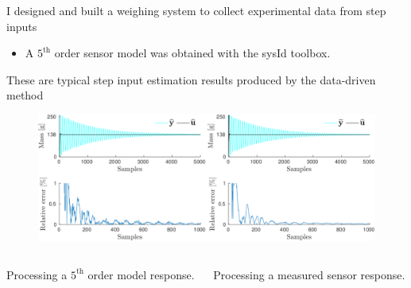 \documentclass[presentation]{beamer}
\begin{document}
\begin{frame}[label={slide:experimental-validation1}]{I designed and built a weighing system \linebreak to collect experimental data from step inputs}
\begin{figure}[!htb]
\end{figure}
\begin{itemize}
	\item A $5^{\text{th}}$ order sensor model was obtained \linebreak with the sysId toolbox.
\end{itemize}
\end{frame}

\begin{frame}[label={slide:experimental-validation2}]{These are typical step input estimation results \linebreak produced by the data-driven method}
\begin{figure}[htb!]
\centering
\hspace*{-5mm} \includegraphics[width=1.1\columnwidth]{./fig/Exp_Fig_1.pdf} 
\end{figure}
\begin{columns}
\begin{column}{0.5\columnwidth}
Processing a $5^{\text{th}}$ order \linebreak model response.
\end{column}
\begin{column}{0.5\columnwidth}
Processing a measured \linebreak sensor response.
\end{column}
\end{columns}
\end{frame}
\end{document}
